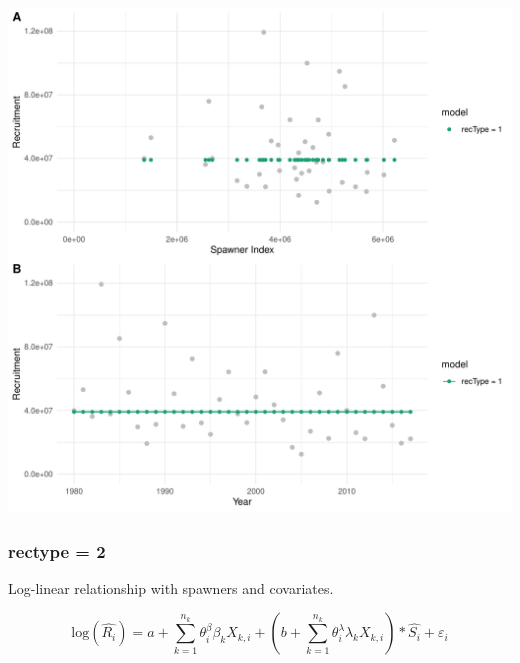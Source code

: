 \documentclass[
]{article}
\begin{document}
\includegraphics{futR_demo_files/figure-latex/plotR1-1.pdf}

\hypertarget{rectype-2}{%
\subsubsection{rectype = 2}\label{rectype-2}}

Log-linear relationship with spawners and covariates.

\[\mathrm{log}(\hat{R_i})= a + \sum_{k=1}^{n_k}{\theta_i^{\beta}\beta_k X_{k,i}}+ (b+\sum_{k=1}^{n_k}{\theta_i^{\lambda}\lambda_k X_{k,i}})* \hat{S_i}+\varepsilon_i\]
\end{document}
